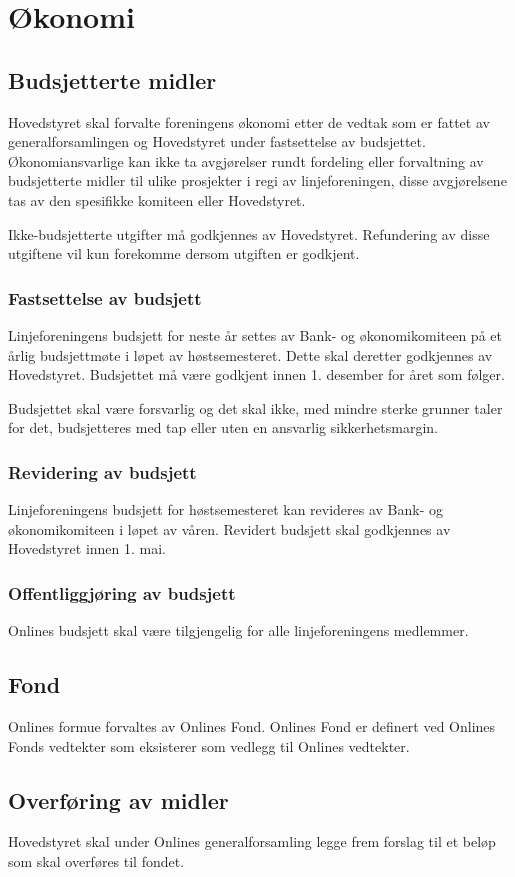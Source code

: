 \chapter{Økonomi}
\label{chap:okonomi}
\vspace{23pt}

\section{Budsjetterte midler}
Hovedstyret skal forvalte foreningens økonomi etter de vedtak som er fattet av generalforsamlingen og Hovedstyret under fastsettelse av budsjettet. Økonomiansvarlige kan ikke ta avgjørelser rundt fordeling eller forvaltning av budsjetterte midler til ulike prosjekter i regi av linjeforeningen, disse avgjørelsene tas av den spesifikke komiteen eller Hovedstyret.

Ikke-budsjetterte utgifter må godkjennes av Hovedstyret. Refundering av disse utgiftene vil kun forekomme dersom utgiften er godkjent.

\subsection{Fastsettelse av budsjett}
Linjeforeningens budsjett for neste år settes av Bank- og økonomikomiteen på et årlig budsjettmøte i løpet av høstsemesteret. Dette skal deretter godkjennes av Hovedstyret. Budsjettet må være godkjent innen 1. desember for året som følger.

Budsjettet skal være forsvarlig og det skal ikke, med mindre sterke grunner taler for det, budsjetteres med tap eller uten en ansvarlig sikkerhetsmargin.

\subsection{Revidering av budsjett}
Linjeforeningens budsjett for høstsemesteret kan revideres av Bank- og økonomikomiteen i løpet av våren. Revidert budsjett skal godkjennes av Hovedstyret innen 1. mai.

\subsection{Offentliggjøring av budsjett}
Onlines budsjett skal være tilgjengelig for alle linjeforeningens medlemmer.

\section{Fond}
\vspace{23pt}

Onlines formue forvaltes av Onlines Fond. Onlines Fond er definert ved Onlines Fonds vedtekter som eksisterer som vedlegg til Onlines vedtekter.

\section{Overføring av midler}
\vspace{23pt}

Hovedstyret skal under Onlines generalforsamling legge frem forslag til et beløp som skal overføres til fondet.
